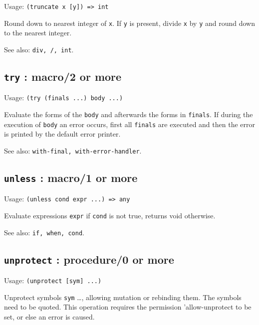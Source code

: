 \documentclass[
]{article}
\newcommand{\passthrough}[1]{#1}
\begin{document}
Usage: \passthrough{\lstinline!(truncate x [y]) => int!}

Round down to nearest integer of \passthrough{\lstinline!x!}. If
\passthrough{\lstinline!y!} is present, divide
\passthrough{\lstinline!x!} by \passthrough{\lstinline!y!} and round
down to the nearest integer.

See also: \passthrough{\lstinline!div, /, int!}.

\hypertarget{try-macro2-or-more-1}{%
\subsection{\texorpdfstring{\texttt{try} : macro/2 or
more}{try : macro/2 or more}}\label{try-macro2-or-more-1}}

Usage: \passthrough{\lstinline!(try (finals ...) body ...)!}

Evaluate the forms of the \passthrough{\lstinline!body!} and afterwards
the forms in \passthrough{\lstinline!finals!}. If during the execution
of \passthrough{\lstinline!body!} an error occurs, first all
\passthrough{\lstinline!finals!} are executed and then the error is
printed by the default error printer.

See also: \passthrough{\lstinline!with-final, with-error-handler!}.

\hypertarget{unless-macro1-or-more-1}{%
\subsection{\texorpdfstring{\texttt{unless} : macro/1 or
more}{unless : macro/1 or more}}\label{unless-macro1-or-more-1}}

Usage: \passthrough{\lstinline!(unless cond expr ...) => any!}

Evaluate expressions \passthrough{\lstinline!expr!} if
\passthrough{\lstinline!cond!} is not true, returns void otherwise.

See also: \passthrough{\lstinline!if, when, cond!}.

\hypertarget{unprotect-procedure0-or-more-1}{%
\subsection{\texorpdfstring{\texttt{unprotect} : procedure/0 or
more}{unprotect : procedure/0 or more}}\label{unprotect-procedure0-or-more-1}}

Usage: \passthrough{\lstinline!(unprotect [sym] ...)!}

Unprotect symbols \passthrough{\lstinline!sym!} \ldots, allowing
mutation or rebinding them. The symbols need to be quoted. This
operation requires the permission 'allow-unprotect to be set, or else an
error is caused.
\end{document}
